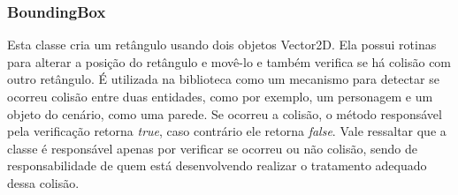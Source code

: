 \subsubsection{BoundingBox}
%
%
Esta classe cria um retângulo usando dois objetos Vector2D. Ela possui rotinas para alterar a posição do retângulo e movê-lo e também verifica se há colisão com outro retângulo. É utilizada na biblioteca como um mecanismo para detectar se ocorreu colisão entre duas entidades, como por exemplo, um personagem e um objeto do cenário, como uma parede. Se ocorreu a colisão, o método responsável pela verificação retorna \textit{true}, caso contrário ele retorna \textit{false}. Vale ressaltar que a classe é responsável apenas por verificar se ocorreu ou não colisão, sendo de responsabilidade de quem está desenvolvendo realizar o tratamento adequado dessa colisão.
%
%
